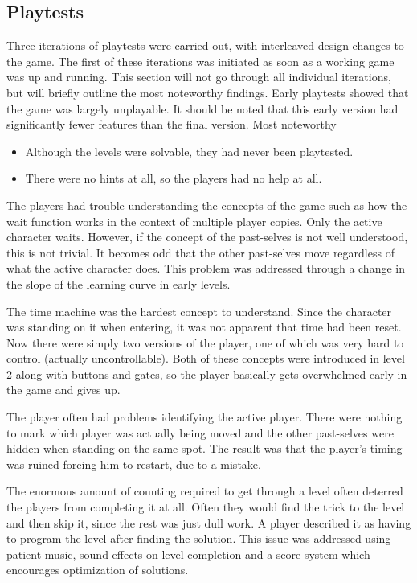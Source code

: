 \subsection{Playtests}
\label{sec:playtests}

Three iterations of playtests were carried out, with interleaved
design changes to the game. The first of these iterations was
initiated as soon as a working game was up and running. This section
will not go through all individual iterations, but will briefly
outline the most noteworthy findings.  Early playtests showed that
the game was largely unplayable. It should be noted that this early
version had significantly fewer features than the final version. Most
noteworthy

\begin{itemize}
\item Although the levels were solvable, they had never been playtested.
\item There were no hints at all, so the players had no help at all.
\end{itemize}

The players had trouble understanding the concepts of the game such as
how the wait function works in the context of multiple player
copies. Only the active character waits.  However, if the concept of the
past-selves is not well understood, this is not trivial. It becomes
odd that the other past-selves move regardless of what the active
character does. This problem was addressed through a change in the
slope of the learning curve in early levels.

The time machine was the hardest concept to understand. Since the
character was standing on it when entering, it was not apparent that
time had been reset. Now there were simply two versions of the player,
one of which was very hard to control (actually uncontrollable). Both
of these concepts were introduced in level 2 along with buttons and
gates, so the player basically gets overwhelmed early in the game and
gives up.

The player often had problems identifying the active player. There
were nothing to mark which player was actually being moved and the
other past-selves were hidden when standing on the same spot. The
result was that the player's timing was ruined forcing him to restart,
due to a mistake.

The enormous amount of counting required to get through a level often
deterred the players from completing it at all. Often they would find
the trick to the level and then skip it, since the rest was just dull
work. A player described it as having to program the level after
finding the solution. This issue was addressed using patient music,
sound effects on level completion and a score system which encourages
optimization of solutions.

